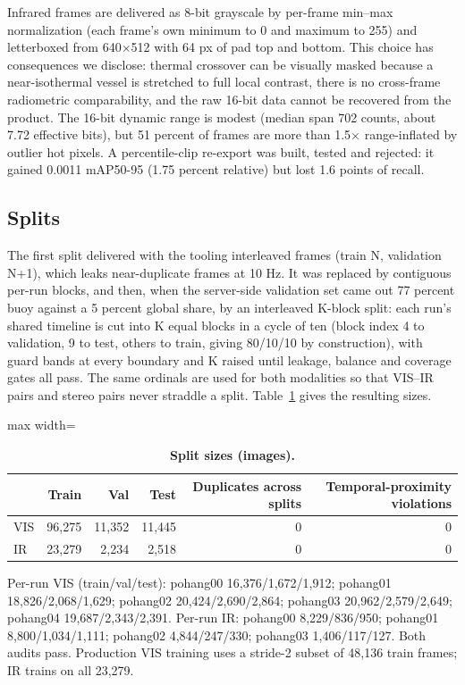 \documentclass[10pt]{article}
\begin{document}
Infrared frames are delivered as 8-bit grayscale by per-frame min--max normalization (each frame's own minimum to 0 and maximum to 255) and letterboxed from 640$\times$512 with 64 px of pad top and bottom. This choice has consequences we disclose: thermal crossover can be visually masked because a near-isothermal vessel is stretched to full local contrast, there is no cross-frame radiometric comparability, and the raw 16-bit data cannot be recovered from the product. The 16-bit dynamic range is modest (median span 702 counts, about 7.72 effective bits), but 51 percent of frames are more than 1.5$\times$ range-inflated by outlier hot pixels. A percentile-clip re-export was built, tested and rejected: it gained 0.0011 mAP50-95 (1.75 percent relative) but lost 1.6 points of recall.

\subsection{Splits}\label{app:B.3}
The first split delivered with the tooling interleaved frames (train N, validation N+1), which leaks near-duplicate frames at 10 Hz. It was replaced by contiguous per-run blocks, and then, when the server-side validation set came out 77 percent buoy against a 5 percent global share, by an interleaved K-block split: each run's shared timeline is cut into K equal blocks in a cycle of ten (block index 4 to validation, 9 to test, others to train, giving 80/10/10 by construction), with guard bands at every boundary and K raised until leakage, balance and coverage gates all pass. The same ordinals are used for both modalities so that VIS--IR pairs and stereo pairs never straddle a split. Table~\ref{tab:S} gives the resulting sizes.

\begin{table}[htbp]
\centering
\footnotesize
\caption{\textbf{Split sizes (images).}}
\label{tab:S}
\begin{adjustbox}{max width=\linewidth}
\begin{tabular}{lrrrrr}
\toprule
 & Train & Val & Test & Duplicates across splits & Temporal-proximity violations \\
\midrule
VIS & 96,275 & 11,352 & 11,445 & 0 & 0 \\
IR & 23,279 & 2,234 & 2,518 & 0 & 0 \\
\bottomrule
\end{tabular}
\end{adjustbox}
\end{table}
Per-run VIS (train/val/test): pohang00 16,376/1,672/1,912; pohang01 18,826/2,068/1,629; pohang02 20,424/2,690/2,864; pohang03 20,962/2,579/2,649; pohang04 19,687/2,343/2,391. Per-run IR: pohang00 8,229/836/950; pohang01 8,800/1,034/1,111; pohang02 4,844/247/330; pohang03 1,406/117/127. Both audits pass. Production VIS training uses a stride-2 subset of 48,136 train frames; IR trains on all 23,279.
\end{document}
